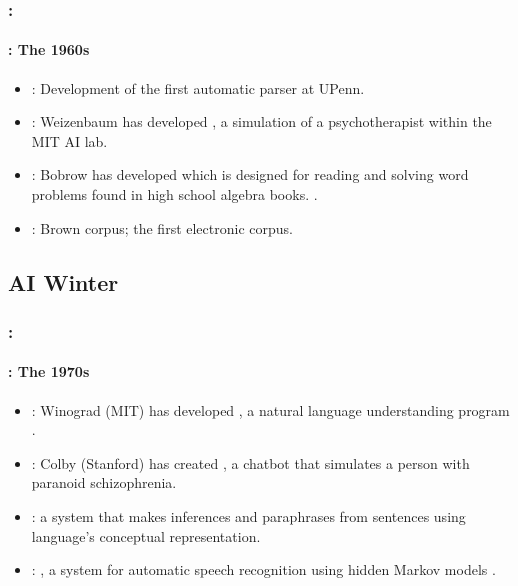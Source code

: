 \documentclass[xcolor=table]{beamer}
\begin{document}
\begin{frame}
	\frametitle{\insertshortsubtitle: \insertsection}
	\framesubtitle{\insertsubsection: The 1960s}

	\begin{itemize}
		\item {}: Development of the first automatic parser at UPenn. \cite{1961-joshi,1962-harris} 
		\item {}: Weizenbaum has developed , a simulation of a psychotherapist within the MIT AI lab.
		\item {}: Bobrow has developed  which is designed for reading and solving word problems found in high school algebra books. \cite{1964-bobrow}.
		\item {}: Brown corpus; the first electronic corpus.
	\end{itemize}

\end{frame}

\subsection{AI Winter}

\begin{frame}
	\frametitle{\insertshortsubtitle: \insertsection}
	\framesubtitle{\insertsubsection: The 1970s}

	\begin{itemize}
		\item {}: Winograd (MIT) has developed , a natural language understanding program \cite{1971-winograd}.
		\item {}: Colby (Stanford) has created , a chatbot that simulates a person with paranoid schizophrenia.
		\item {}:  a system that makes inferences and paraphrases from sentences using language's conceptual representation.
		\item {}: , a system for automatic speech recognition using hidden Markov models \cite{1975-baker}.
	\end{itemize}

\end{frame}
\end{document}
